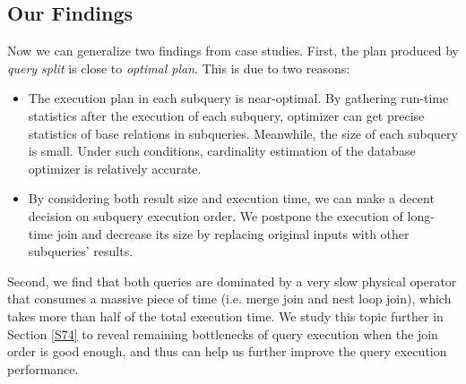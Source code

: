 \subsection{Our Findings} \label{S73}
    Now we can generalize two findings from case studies. First, the plan produced by \textit{query split} is close to \textit{optimal plan}. This is due to two reasons:
    \begin{itemize}[leftmargin = 15pt]
        \item The execution plan in each subquery is near-optimal. By gathering run-time statistics after the execution of each subquery, optimizer can get precise statistics of base relations in subqueries. Meanwhile, the size of each subquery is small. Under such conditions, cardinality estimation of the database optimizer is relatively accurate.
        \item By considering both result size and execution time, we can make a decent decision on subquery execution order. We postpone the execution of long-time join and decrease its size by replacing original inputs with other subqueries' results.
    \end{itemize}\par
    Second, we find that both queries are dominated by a very slow physical operator that consumes a massive piece of time (i.e. merge join and nest loop join), which takes more than half of the total execution time. We study this topic further in Section \ref{S74} to reveal remaining bottlenecks of query execution when the join order is good enough, and thus can help us further improve the query execution performance.

